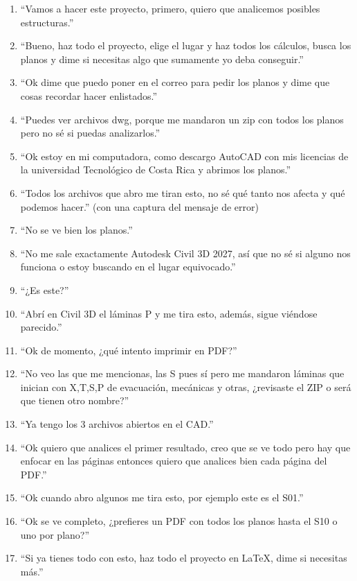 \begin{enumerate}
    \item ``Vamos a hacer este proyecto, primero, quiero que analicemos posibles estructuras.''
    \item ``Bueno, haz todo el proyecto, elige el lugar y haz todos los cálculos, busca los planos y dime si necesitas algo que sumamente yo deba conseguir.''
    \item ``Ok dime que puedo poner en el correo para pedir los planos y dime que cosas recordar hacer enlistados.''
    \item ``Puedes ver archivos dwg, porque me mandaron un zip con todos los planos pero no sé si puedas analizarlos.''
    \item ``Ok estoy en mi computadora, como descargo AutoCAD con mis licencias de la universidad Tecnológico de Costa Rica y abrimos los planos.''
    \item ``Todos los archivos que abro me tiran esto, no sé qué tanto nos afecta y qué podemos hacer.'' (con una captura del mensaje de error)
    \item ``No se ve bien los planos.''
    \item ``No me sale exactamente Autodesk Civil 3D 2027, así que no sé si alguno nos funciona o estoy buscando en el lugar equivocado.''
    \item ``¿Es este?''
    \item ``Abrí en Civil 3D el láminas P y me tira esto, además, sigue viéndose parecido.''
    \item ``Ok de momento, ¿qué intento imprimir en PDF?''
    \item ``No veo las que me mencionas, las S pues sí pero me mandaron láminas que inician con X,T,S,P de evacuación, mecánicas y otras, ¿revisaste el ZIP o será que tienen otro nombre?''
    \item ``Ya tengo los 3 archivos abiertos en el CAD.''
    \item ``Ok quiero que analices el primer resultado, creo que se ve todo pero hay que enfocar en las páginas entonces quiero que analices bien cada página del PDF.''
    \item ``Ok cuando abro algunos me tira esto, por ejemplo este es el S01.''
    \item ``Ok se ve completo, ¿prefieres un PDF con todos los planos hasta el S10 o uno por plano?''
    \item ``Si ya tienes todo con esto, haz todo el proyecto en LaTeX, dime si necesitas más.''
\end{enumerate}

